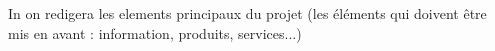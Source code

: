 In on redigera les elements principaux du projet
(les éléments qui doivent être mis en avant : information, produits, services...)